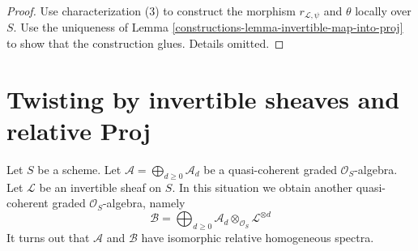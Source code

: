 \begin{proof}

Use characterization (3) to construct the morphism $r_{\mathcal{L}, \psi}$
and $\theta$ locally over $S$. Use the uniqueness of
Lemma \ref{constructions-lemma-invertible-map-into-proj}
to show that the construction glues. Details omitted.
\end{proof}

\section{Twisting by invertible sheaves and relative Proj}
\label{constructions-section-twisting-and-proj}
Let $S$ be a scheme.
Let $\mathcal{A} = \bigoplus_{d \geq 0} \mathcal{A}_d$ be a
quasi-coherent graded $\mathcal{O}_S$-algebra.
Let $\mathcal{L}$ be an invertible sheaf on $S$.
In this situation we obtain another quasi-coherent graded
$\mathcal{O}_S$-algebra, namely
$$
\mathcal{B}
=
\bigoplus\nolimits_{d \geq 0}
\mathcal{A}_d \otimes_{\mathcal{O}_S} \mathcal{L}^{\otimes d}
$$
It turns out that $\mathcal{A}$ and $\mathcal{B}$ have
isomorphic relative homogeneous spectra.

